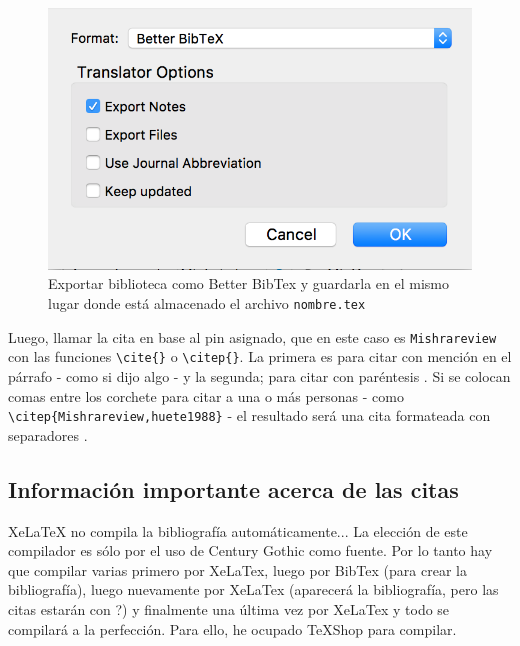 \documentclass[11pt,]{article}
\begin{document}
\begin{figure}[!h]
\begin{center}
\includegraphics[width=\textwidth]{Figuras/better.png}
\caption{Exportar biblioteca como Better BibTex y guardarla en el mismo lugar donde está almacenado el archivo \texttt{nombre.tex}}
\label{etiqueta_figura5}
\end{center}
\end{figure}

\clearpage

Luego, llamar la cita en base al pin asignado, que en este caso es \verb!Mishrareview! con las funciones \verb!\cite{}! o \verb!\citep{}!. La primera es para citar con mención en el párrafo - como si \cite{Mishrareview} dijo algo - y la segunda; para citar con paréntesis \citep{Mishrareview}. Si se colocan comas entre los corchete para citar a una o más personas - como \verb!\citep{Mishrareview,huete1988}! - el resultado será una cita formateada con separadores \citep{Mishrareview,huete1988}.\\

\subsection{Información importante acerca de las citas\\}

XeLaTeX no compila la bibliografía automáticamente... La elección de este compilador es sólo por el uso de Century Gothic como fuente. Por lo tanto hay que compilar varias primero por XeLaTex, luego por BibTex (para crear la bibliografía), luego nuevamente por XeLaTex (aparecerá la bibliografía, pero las citas estarán con ?) y finalmente una última vez por XeLaTex y todo se compilará a la perfección. Para ello, he ocupado TeXShop para compilar.\\
\end{document}
